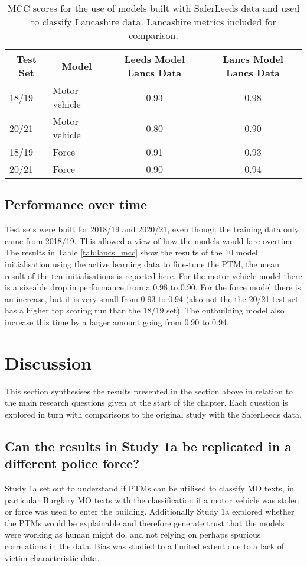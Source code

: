 \begin{table}[]
\begin{tabular}{@{}llcc@{}}
\toprule
\multicolumn{1}{c}{Test Set} & \multicolumn{1}{c}{Model} & Leeds Model Lancs Data & Lancs Model Lancs Data \\ \midrule
18/19                        & Motor vehicle             & 0.93                   & 0.98                   \\
20/21                        & Motor vehicle             & 0.80                   & 0.90                   \\
18/19                        & Force                     & 0.91  & 0.93  \\
20/21                        & Force                     & 0.90  & 0.94 \\ \bottomrule
\end{tabular}
\caption{\label{tab:results_transfer} MCC scores for the use of models built with SaferLeeds data and used to classify Lancashire data. Lancashire metrics included for comparison. }
\end{table}

\subsection{Performance over time} Test sets were built for 2018/19 and 2020/21, even though the training data only came from 2018/19. This allowed a view of how the models would fare overtime. The results in Table \ref{tab:lancs_mcc} show the results of the 10 model initialisation using the active learning data to fine-tune the PTM, the mean result of the ten initialisations is reported here. For the motor-vehicle model there is a sizeable drop in performance from a 0.98 to 0.90. For the force model there is an increase, but it is very small from 0.93 to 0.94 (also not the the 20/21 test set has a higher top scoring run than the 18/19 set). The outbuilding model also increase this time by a larger amount going from 0.90 to 0.94.


\section{Discussion} This section synthesises the results presented in the section above in relation to the main research questions given at the start of the chapter. Each question is explored in turn with comparisons to the original study with the SaferLeeds data.

\subsection{Can the results in Study 1a be replicated in a different police force?}Study 1a set out to understand if PTMs can be utilised to classify MO texts, in particular Burglary MO texts with the classification if a motor vehicle was stolen or force was used to enter the building. Additionally Study 1a explored whether the PTMs would be explainable and therefore generate trust that the models were working as human might do, and not relying on perhaps spurious correlations in the data. Bias was studied to a limited extent due to a lack of victim characteristic data.

